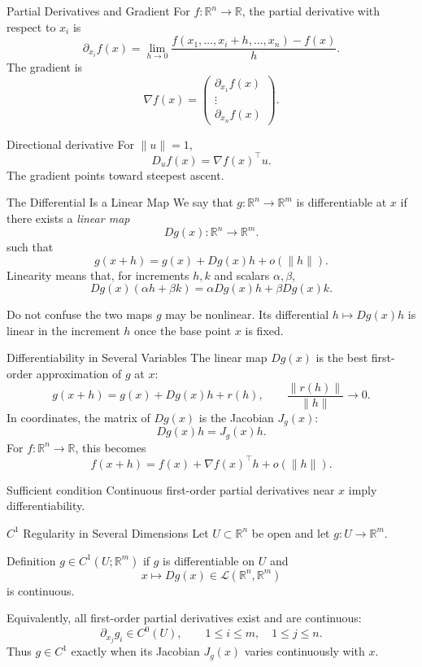 \documentclass[aspectratio=169]{beamer}
\newcommand{\R}{\mathbb{R}}
\begin{document}
\begin{frame}{Partial Derivatives and Gradient}
For $f:\R^n\to\R$, the partial derivative with respect to $x_i$ is
\[
\partial_{x_i}f(x)
=
\lim_{h\to 0}
\frac{f(x_1,\ldots,x_i+h,\ldots,x_n)-f(x)}{h}.
\]
\pause
The gradient is
\[
\nabla f(x)=
\begin{pmatrix}
\partial_{x_1}f(x)\\
\vdots\\
\partial_{x_n}f(x)
\end{pmatrix}.
\]
\pause
\begin{block}{Directional derivative}
For $\|u\|=1$,
\[
D_uf(x)=\nabla f(x)^\top u.
\]
The gradient points toward steepest ascent.
\end{block}
\end{frame}

\begin{frame}{The Differential Is a Linear Map}
We say that $g:\R^n\to\R^m$ is differentiable at $x$ if there exists a
\emph{linear map}
\[
Dg(x):\R^n\longrightarrow\R^m.
\]
such that
\[
g(x+h)=g(x)+Dg(x)h+o(\|h\|).
\]
\pause
Linearity means that, for increments $h,k$ and scalars $\alpha,\beta$,
\[
\boxed{Dg(x)(\alpha h+\beta k)
=\alpha Dg(x)h+\beta Dg(x)k.}
\]
\begin{alertblock}{Do not confuse the two maps}
$g$ may be nonlinear. Its differential $h\mapsto Dg(x)h$ is linear in the
increment $h$ once the base point $x$ is fixed.
\end{alertblock}
\end{frame}

\begin{frame}{Differentiability in Several Variables}
The linear map $Dg(x)$ is the best first-order approximation of $g$ at $x$:
\[
g(x+h)=g(x)+Dg(x)h+r(h),
\qquad \frac{\|r(h)\|}{\|h\|}\to0.
\]
\pause
In coordinates, the matrix of $Dg(x)$ is the Jacobian $J_g(x)$:
\[
Dg(x)h=J_g(x)h.
\]
For $f:\R^n\to\R$, this becomes
\[
f(x+h)=f(x)+\nabla f(x)^\top h+o(\|h\|).
\]
\begin{block}{Sufficient condition}
Continuous first-order partial derivatives near $x$ imply differentiability.
\end{block}
\end{frame}

\begin{frame}{$C^1$ Regularity in Several Dimensions}
Let $U\subset\R^n$ be open and let $g:U\to\R^m$.
\begin{block}{Definition}
$g\in C^1(U;\R^m)$ if $g$ is differentiable on $U$ and
\[
x\longmapsto Dg(x)\in\mathcal L(\R^n,\R^m)
\]
is continuous.
\end{block}
\pause
Equivalently, all first-order partial derivatives exist and are continuous:
\[
\partial_{x_j}g_i\in C^0(U),
\qquad 1\leq i\leq m,\quad 1\leq j\leq n.
\]
Thus $g\in C^1$ exactly when its Jacobian $J_g(x)$ varies continuously with
$x$.
\end{frame}
\end{document}
